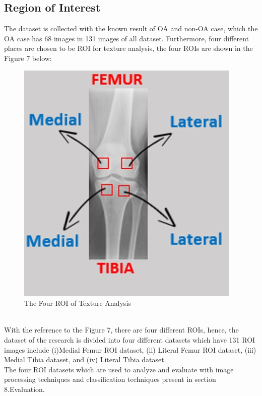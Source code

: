 \documentclass[review]{elsarticle}
\begin{document}
\subsection{Region of Interest}
The dataset is collected with the known result of OA and non-OA case, which the OA case has 68 images in 131 images of all dataset. Furthermore, four different places are chosen to be ROI for texture analysis, the four ROIs are shown in the Figure 7 below: \\
\begin{figure}[h]
	\centering
	\includegraphics[width=0.5\linewidth]{pic/fig9}
	\caption{The Four ROI of Texture Analysis}
	\label{fig:fig9}
\end{figure} \\
With the reference to the Figure 7,  there are four different ROIs, hence, the dataset of the research is divided into four different datasets which have 131 ROI images include (i)Medial Femur ROI dataset, (ii) Literal Femur ROI dataset, (iii) Medial Tibia dataset, and (iv) Literal Tibia dataset. \\ 
The four ROI datasets which are used to analyze and evaluate with image processing techniques and classification techniques present in section 8.Evaluation. 
\end{document}
